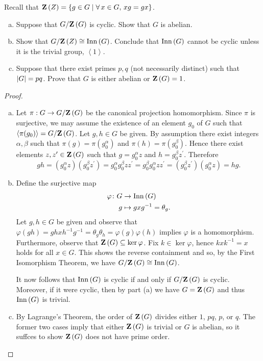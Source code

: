 \documentclass[10pt]{amsart}
\begin{document}
\begin{thm}
  Recall that $\mathbf{Z}\left(Z\right) = \left\{ g \in G \mid \forall\, x \in G, \, xg = gx \right\}$.
  \begin{enumerate}[(a)]
  \item
    Suppose that $G/\mathbf{Z}\left(G\right)$ is cyclic.  Show that $G$ is abelian.
  \item
    Show that $G/\mathbf{Z}\left(Z\right) \cong \operatorname{Inn}\left(G\right)$.  Conclude that $\operatorname{Inn}\left(G\right)$ cannot be cyclic unless it is the trivial group, $\left<1\right>$.
  \item
    Suppose that there exist primes $p,q$ (not necessarily distinct) such that $\left\lvert G \right\rvert = pq$.
    Prove that $G$ is either abelian or $\mathbf{Z}\left(G\right) = 1$.
  \end{enumerate}
  \begin{proof}
    \begin{enumerate}[(a)]
    \item
      Let $\pi: G \rightarrow G/\mathbf{Z}\left(G\right)$ be the canonical projection homomorphism.
      Since $\pi$ is surjective, we may assume the existence of an element $g_0$ of $G$ such that $\left< \pi(g_0) \right> = G/\mathbf{Z}\left(G\right)$.
      Let $g,h \in G$ be given.
      By assumption there exist integers $\alpha, \beta$ such that $\pi(g) = \pi(g_0^{\alpha})$ and $\pi(h) = \pi(g_0^{\beta})$.
      Hence there exist elements $z, z^{\prime} \in \mathbf{Z}\left(G\right)$ such that $g = g_0^{\alpha}z$ and $h = g_0^{\beta}z^{\prime}$.
      Therefore
      $$gh = (g_0^{\alpha}z)(g_0^{\beta}z^{\prime})
      = g_0^{\alpha}g_0^{\beta}zz^{\prime}
      = g_0^{\beta}g_0^{\alpha}zz^{\prime}
      = (g_0^{\beta}z^{\prime})(g_0^{\alpha}z)
      = hg.$$
    \item
      Define the surjective map
      \begin{align*}
	\varphi \colon G &\rightarrow \operatorname{Inn}\left(G\right)\\
	g & \mapsto gxg^{-1} = \theta_g.
      \end{align*}
      Let $g,h \in G$ be given and observe that $\varphi(gh) = ghxh^{-1}g^{-1} = \theta_g\theta_h = \varphi(g)\varphi(h)$ implies $\varphi$ is a homomorphism.
      Furthermore, observe that $\mathbf{Z}\left(G\right) \subseteq \ker \varphi$.
      Fix $k \in \ker\varphi$, hence $kxk^{-1} = x$ holds for all $x \in G$.
      This shows the reverse containment and so, by the First Isomorphism Theorem, we have $G/\mathbf{Z}\left(G\right) \cong \operatorname{Inn}\left(G\right)$.
      
      It now follows that $\operatorname{Inn}\left(G\right)$ is cyclic if and only if $G/\mathbf{Z}\left(G\right)$ is cyclic.
      Moreover, if it were cyclic, then by part (a) we have $G = \mathbf{Z}\left(G\right)$ and thus $\operatorname{Inn}\left(G\right)$ is trivial.
    \item
      By Lagrange's Theorem, the order of $\mathbf{Z}\left(G\right)$ divides either $1$, $pq$, $p$, or $q$.
      The former two cases imply that either $\mathbf{Z}\left(G\right)$ is trivial or $G$ is abelian, so it suffces to show $\mathbf{Z}\left(G\right)$ does not have prime order.
      

\end{enumerate}
\end{proof}
\end{thm}
\end{document}
